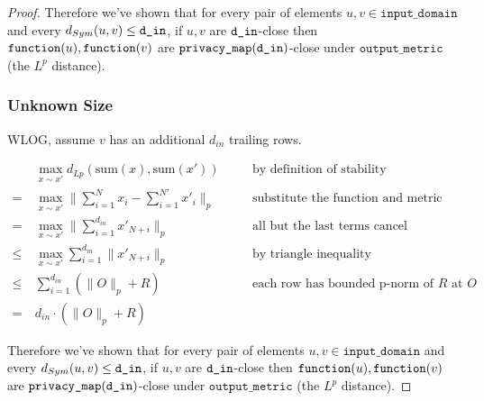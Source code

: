 \documentclass{article}
\begin{document}
\begin{proof}
    Therefore we've shown that for every pair of elements $u, v \in \texttt{input\_domain}$ and every $d_{Sym}(u, v) \le \texttt{d\_in}$, 
    if $u, v$ are $\texttt{d\_in}$-close then $\texttt{function}(u),\texttt{function}(v)$ are $\texttt{privacy\_map}(\texttt{d\_in})$-close under $\texttt{output\_metric}$ (the $L^p$ distance).

\subsubsection{Unknown Size}

    WLOG, assume $v$ has an additional $d_{in}$ trailing rows.

    \begin{align}
        & \ \max_{x \sim x'} d_{Lp}(\mathrm{sum}(x), \mathrm{sum}(x')) && \quad \text{by definition of stability}\\
        =&\ \max_{x \sim x'} \lVert\sum_{i = 1}^N x_i - \sum_{i = 1}^{N'} x'_i \rVert_p && \quad \text{substitute the function and metric} \\
        =&\ \max_{x \sim x'} \lVert\sum_{i = 1}^{d_{in}} x'_{N + i}\rVert_p && \quad\text{all but the last terms cancel} \\
        \le&\ \max_{x \sim x'} \sum_{i = 1}^{d_{in}} \lVert x'_{N + i} \rVert_p && \quad \text{by triangle inequality} \\
        \le&\ \sum_{i = 1}^{d_{in}} (\lVert O \rVert_p + R) && \quad\text{each row has bounded p-norm of } R \text{ at } O \\
        =&\ d_{in} \cdot (\lVert O \rVert_p + R)
    \end{align}
    
    Therefore we've shown that for every pair of elements $u, v \in \texttt{input\_domain}$ and every $d_{Sym}(u, v) \le \texttt{d\_in}$, 
    if $u, v$ are $\texttt{d\_in}$-close then $\texttt{function}(u),\texttt{function}(v)$ are $\texttt{privacy\_map}(\texttt{d\_in})$-close under $\texttt{output\_metric}$ (the $L^p$ distance).

\end{proof}
\end{document}
